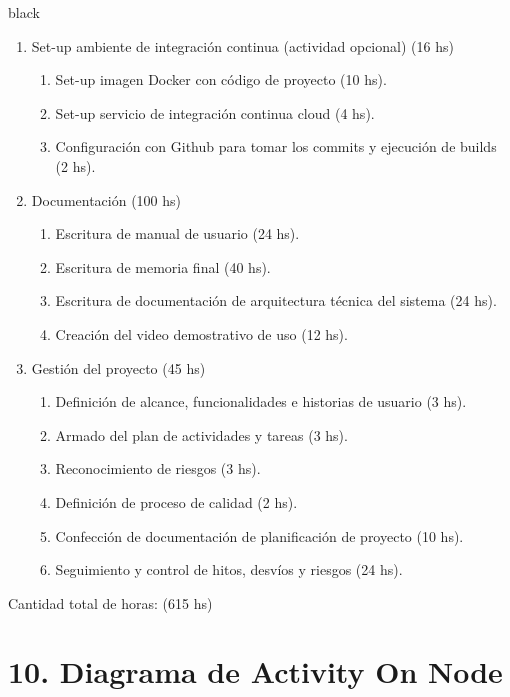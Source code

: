 \documentclass[
11pt, %
]{charter}
\begin{document}
\begin{consigna}{black}
\begin{enumerate}
\item Set-up ambiente de integración continua (actividad opcional) (16 hs)
	\begin{enumerate}
	\item Set-up imagen Docker con código de proyecto (10 hs).
	\item Set-up servicio de integración continua cloud (4 hs).
	\item Configuración con Github para tomar los commits y ejecución de builds (2 hs).
	\end{enumerate}

\item Documentación (100 hs)
	\begin{enumerate}				
	\item Escritura de manual de usuario (24 hs).			
	\item Escritura de memoria final (40 hs).
	\item Escritura de documentación de arquitectura técnica del sistema (24 hs).		
	\item Creación del video demostrativo de uso (12 hs).				
	\end{enumerate}	


\item Gestión del proyecto (45 hs)
	\begin{enumerate}
	\item Definición de alcance, funcionalidades e historias de usuario (3 hs).	
	\item Armado del plan de actividades y tareas (3 hs).
	\item Reconocimiento de riesgos (3 hs).
	\item Definición de proceso de calidad (2 hs).
	\item Confección de documentación de planificación de proyecto (10 hs).
	\item Seguimiento y control de hitos, desvíos y riesgos (24 hs).	
	\end{enumerate}
		
\end{enumerate}

Cantidad total de horas: (615 hs)

\end{consigna}

\section{10. Diagrama de Activity On Node}
\label{sec:AoN}
\end{document}
